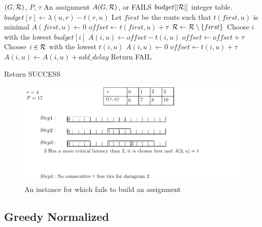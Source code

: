 \documentclass[english]{article}
\begin{document}
\begin{algorithm}[H]
	\caption{\greedydeadline}
	\begin{algorithmic}
	\REQUIRE $(G,{\cal R})$, $P$, $\tau$
	\ENSURE An assignment $A(G,{\cal R})$, or FAILS
	\STATE $budget[|{\cal R}|]$ integer table.
      \STATE  $budget[r] \leftarrow \lambda(u,r) - t(r,u)$
	\ENDFOR
	\STATE Let $first$ be the route such that $t(first,u)$ is minimal
	\STATE $A(first,u) \leftarrow 0$
	\STATE $offset \leftarrow t(first,u)+\tau$
	\STATE ${\cal R} \leftarrow {\cal R}\setminus \{first\}$
    \STATE Choose $i$ with the lowest $budget[i]$
    \STATE $A(i,u) \leftarrow offset - t(i,u)$
    \STATE $offset \leftarrow offset + \tau$
    \ELSE
     \STATE Choose $i \in {\cal R}$ with the lowest $t(i,u)$
     \STATE $A(i,u) \leftarrow 0$
     \STATE $offset \leftarrow t(i,u) + \tau$
    \ENDIF
    \STATE $A(i,u) \leftarrow A(i,u) + add\_delay$
    \ELSE
   \STATE Return FAIL
    \ENDIF
    \ENDIF
    
    \ENDWHILE
    \STATE Return SUCCESS
	\end{algorithmic}
	\end{algorithm}

   \begin{figure} 
	\centering
	\includegraphics[scale=0.8]{examplegreedyfail}
\caption{An instance for which \greedydeadline fails to build an assignment}
\label{fig:examplegreedyfail}   
\end{figure}
\subsection{Greedy Normalized}
\end{document}
